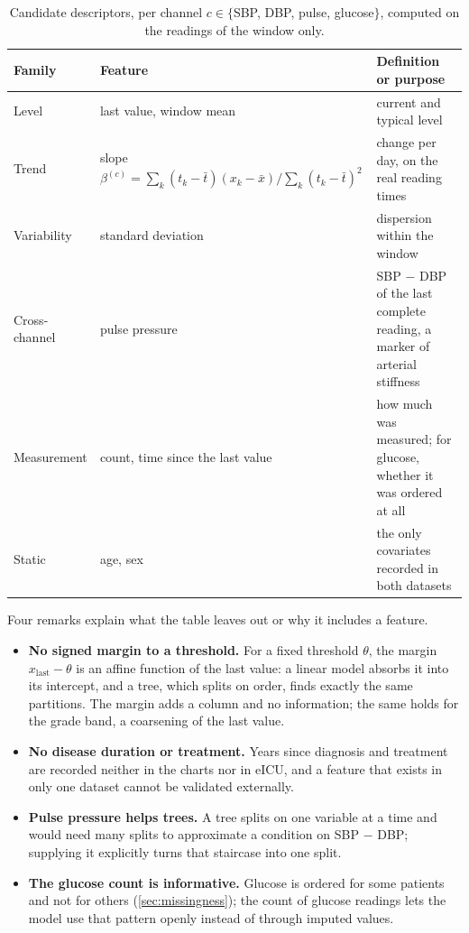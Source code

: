 \documentclass[11pt,a4paper,oneside]{report}
\begin{document}
\begin{table}[htbp]
\centering\footnotesize
\caption{Candidate descriptors, per channel $c \in \{$SBP, DBP, pulse, glucose$\}$, computed on the readings of the window only.}\label{tab:feature-families}
\begin{tabularx}{\textwidth}{@{}>{\raggedright\arraybackslash}p{2.4cm} >{\raggedright\arraybackslash}p{4.2cm} X@{}}
\toprule
\textbf{Family} & \textbf{Feature} & \textbf{Definition or purpose} \\
\midrule
Level & last value, window mean & current and typical level \\
Trend & slope $\beta^{(c)} = \sum_k (t_k - \bar t)(x_k - \bar x) / \sum_k (t_k - \bar t)^2$ & change per day, on the real reading times \\
Variability & standard deviation & dispersion within the window \\
Cross-channel & pulse pressure & SBP $-$ DBP of the last complete reading, a marker of arterial stiffness \\
Measurement & count, time since the last value & how much was measured; for glucose, whether it was ordered at all \\
Static & age, sex & the only covariates recorded in both datasets \\
\bottomrule
\end{tabularx}
\end{table}

Four remarks explain what the table leaves out or why it includes a feature.
\begin{itemize}
  \item \textbf{No signed margin to a threshold.} For a fixed threshold $\theta$, the margin $x_{\text{last}} - \theta$ is an affine function of the last value: a linear model absorbs it into its intercept, and a tree, which splits on order, finds exactly the same partitions. The margin adds a column and no information; the same holds for the grade band, a coarsening of the last value.
  \item \textbf{No disease duration or treatment.} Years since diagnosis and treatment are recorded neither in the charts nor in eICU, and a feature that exists in only one dataset cannot be validated externally.
  \item \textbf{Pulse pressure helps trees.} A tree splits on one variable at a time and would need many splits to approximate a condition on SBP $-$ DBP; supplying it explicitly turns that staircase into one split.
  \item \textbf{The glucose count is informative.} Glucose is ordered for some patients and not for others (\cref{sec:missingness}); the count of glucose readings lets the model use that pattern openly instead of through imputed values.
\end{itemize}
\end{document}
